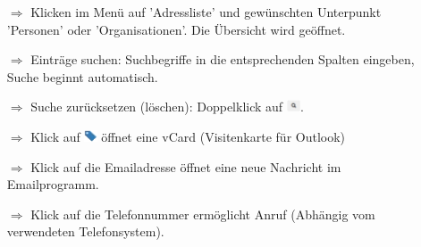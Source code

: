 \documentclass{article}
\begin{document}
\begin{multicols}{2}

\begin{tcolorbox}[colback=blue!5,colframe=blue!40!black,title=Adressliste verwenden (Grundfunktionen)]
\begin{itemize}
  \item[$\Longrightarrow$] Klicken im Menü auf 'Adressliste' und gewünschten Unterpunkt 'Personen' oder 'Organisationen'. Die Übersicht wird geöffnet.
  \item[$\Longrightarrow$] Einträge suchen: Suchbegriffe in die entsprechenden Spalten eingeben, Suche beginnt automatisch.
  \item[$\Longrightarrow$] Suche zurücksetzen (löschen): Doppelklick auf \includegraphics[height=10pt]{Icons/Lupe_s.png}.
  \item[$\Longrightarrow$] Klick auf \includegraphics[height=10pt]{Icons/vCard.png} öffnet eine vCard (Visitenkarte für Outlook) 
	\item[$\Longrightarrow$] Klick auf die Emailadresse öffnet eine neue Nachricht im Emailprogramm.
	\item[$\Longrightarrow$] Klick auf die Telefonnummer ermöglicht Anruf (Abhängig vom verwendeten Telefonsystem).
\end{itemize}
\end{tcolorbox}


\end{multicols}
\end{document}
